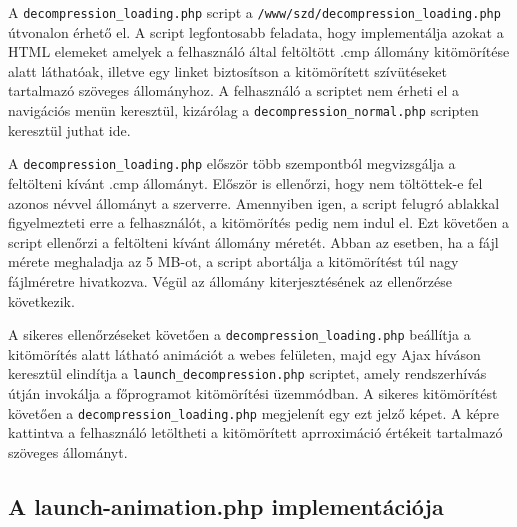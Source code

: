 \documentclass[oneside,titlepage,12pt,a4paper]{report}
\begin{document}
A \texttt{decompression\_loading.php} script a \texttt{/www/szd/decompression\_loading.php} útvonalon érhető el. A script legfontosabb feladata, hogy implementálja azokat a HTML elemeket amelyek a felhasználó által feltöltött .cmp állomány kitömörítése alatt láthatóak, illetve egy linket biztosítson a kitömörített szívütéseket tartalmazó szöveges állományhoz. A felhasználó a scriptet nem érheti el a navigációs menün keresztül, kizárólag a \texttt{decompression\_normal.php} scripten keresztül juthat ide. 
\par A \texttt{decompression\_loading.php} először több szempontból megvizsgálja a feltölteni kívánt .cmp állományt. Először is ellenőrzi, hogy nem töltöttek-e fel azonos névvel állományt a szerverre. Amennyiben igen, a script felugró ablakkal figyelmezteti erre a felhasználót, a kitömörítés pedig nem indul el. Ezt követően a script ellenőrzi a feltölteni kívánt állomány méretét. Abban az esetben, ha a fájl mérete meghaladja az 5 MB-ot, a script abortálja a kitömörítést túl nagy fájlméretre hivatkozva. Végül az állomány kiterjesztésének az ellenőrzése következik.
\par A sikeres ellenőrzéseket követően a \texttt{decompression\_loading.php} beállítja a kitömörítés alatt látható animációt a webes felületen, majd egy Ajax híváson keresztül elindítja a \texttt{launch\_decompression.php} scriptet, amely rendszerhívás útján invokálja a főprogramot kitömörítési üzemmódban. A sikeres kitömörítést követően a \texttt{decompression\_loading.php} megjelenít egy ezt jelző képet. A képre kattintva a felhasználó letöltheti a kitömörített aprroximáció értékeit tartalmazó szöveges állományt. 

\subsection{A launch-animation.php implementációja}
\end{document}
